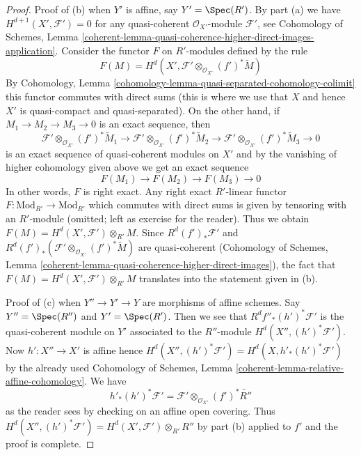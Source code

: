\begin{proof}
\medskip\noindent
Proof of (b) when $Y'$ is affine, say $Y' = \Spec(R')$.
By part (a) we have $H^{d + 1}(X', \mathcal{F}') = 0$
for any quasi-coherent $\mathcal{O}_{X'}$-module $\mathcal{F}'$, see
Cohomology of Schemes, Lemma
\ref{coherent-lemma-quasi-coherence-higher-direct-images-application}.
Consider the functor $F$ on $R'$-modules defined by the rule
$$
F(M) = H^d(X', \mathcal{F}' \otimes_{\mathcal{O}_{X'}} (f')^*\widetilde{M})
$$
By Cohomology, Lemma \ref{cohomology-lemma-quasi-separated-cohomology-colimit}
this functor commutes with direct sums (this is where we use that
$X$ and hence $X'$ is quasi-compact and quasi-separated).
On the other hand, if $M_1 \to M_2 \to M_3 \to 0$ is an exact sequence,
then
$$
\mathcal{F}' \otimes_{\mathcal{O}_{X'}} (f')^*\widetilde{M}_1 \to
\mathcal{F}' \otimes_{\mathcal{O}_{X'}} (f')^*\widetilde{M}_2 \to
\mathcal{F}' \otimes_{\mathcal{O}_{X'}} (f')^*\widetilde{M}_3 \to 0
$$
is an exact sequence of quasi-coherent modules on $X'$
and by the vanishing of higher cohomology given above we get an exact sequence
$$
F(M_1) \to F(M_2) \to F(M_3) \to 0
$$
In other words, $F$ is right exact. Any right exact $R'$-linear functor
$F : \text{Mod}_{R'} \to \text{Mod}_{R'}$
which commutes with direct sums is given by tensoring with an $R'$-module
(omitted; left as exercise for the reader).
Thus we obtain $F(M) = H^d(X', \mathcal{F}') \otimes_{R'} M$.
Since $R^d(f')_*\mathcal{F}'$ and
$R^d(f')_*(\mathcal{F}' \otimes_{\mathcal{O}_{X'}} (f')^*\widetilde{M})$
are quasi-coherent (Cohomology of Schemes, Lemma
\ref{coherent-lemma-quasi-coherence-higher-direct-images}),
the fact that $F(M) = H^d(X', \mathcal{F}') \otimes_{R'} M$
translates into the statement given in (b).

\medskip\noindent
Proof of (c) when $Y'' \to Y' \to Y$ are morphisms of affine schemes.
Say $Y'' = \Spec(R'')$ and $Y' = \Spec(R')$.
Then we see that $R^df''_*(h')^*\mathcal{F}'$
is the quasi-coherent module on $Y'$ associated to the $R''$-module
$H^d(X'', (h')^*\mathcal{F}')$. Now $h' : X'' \to X'$ is affine
hence $H^d(X'', (h')^*\mathcal{F}') = H^d(X, h'_*(h')^*\mathcal{F}')$
by the already used
Cohomology of Schemes, Lemma \ref{coherent-lemma-relative-affine-cohomology}.
We have
$$
h'_*(h')^*\mathcal{F}' =
\mathcal{F}' \otimes_{\mathcal{O}_{X'}} (f')^*\widetilde{R''}
$$
as the reader sees by checking on an affine open covering. Thus
$H^d(X'', (h')^*\mathcal{F}') = H^d(X', \mathcal{F}') \otimes_{R'} R''$
by part (b) applied to $f'$ and the proof is complete.
\end{proof}

